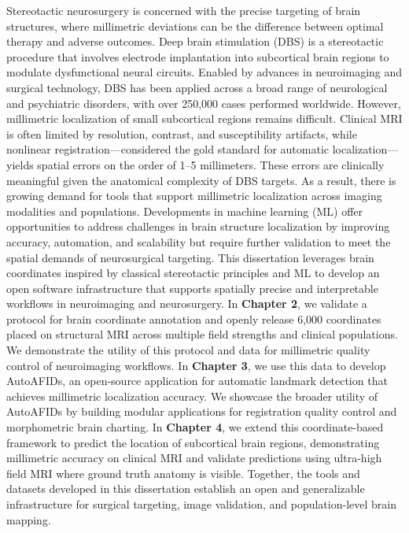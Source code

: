 \onehalfspacing
Stereotactic neurosurgery is concerned with the precise targeting of brain structures, where millimetric deviations can be the difference between optimal therapy and adverse outcomes. Deep brain stimulation (DBS) is a stereotactic procedure that involves electrode implantation into subcortical brain regions to modulate dysfunctional neural circuits. Enabled by advances in neuroimaging and surgical technology, DBS has been applied across a broad range of neurological and psychiatric disorders, with over 250,000 cases performed worldwide. However, millimetric localization of small subcortical regions remains difficult. Clinical MRI is often limited by resolution, contrast, and susceptibility artifacts, while nonlinear registration—considered the gold standard for automatic localization—yields spatial errors on the order of 1–5 millimeters. These errors are clinically meaningful given the anatomical complexity of DBS targets. As a result, there is growing demand for tools that support millimetric localization across imaging modalities and populations. Developments in machine learning (ML) offer opportunities to address challenges in brain structure localization by improving accuracy, automation, and scalability but require further validation to meet the spatial demands of neurosurgical targeting. This dissertation leverages brain coordinates inspired by classical stereotactic principles and ML to develop an open software infrastructure that supports spatially precise and interpretable workflows in neuroimaging and neurosurgery. In \textbf{Chapter 2}, we validate a protocol for brain coordinate annotation and openly release 6,000 coordinates placed on structural MRI across multiple field strengths and clinical populations. We demonstrate the utility of this protocol and data for millimetric quality control of neuroimaging workflows. In \textbf{Chapter 3}, we use this data to develop AutoAFIDs, an open-source application for automatic landmark detection that achieves millimetric localization accuracy. We showcase the broader utility of AutoAFIDs by building modular applications for registration quality control and morphometric brain charting. In \textbf{Chapter 4}, we extend this coordinate-based framework to predict the location of subcortical brain regions, demonstrating millimetric accuracy on clinical MRI and validate predictions using ultra-high field MRI where ground truth anatomy is visible. Together, the tools and datasets developed in this dissertation establish an open and generalizable infrastructure for surgical targeting, image validation, and population-level brain mapping.
